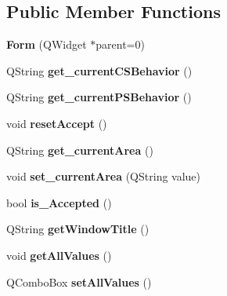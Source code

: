 \subsection*{Public Member Functions}
\begin{DoxyCompactItemize}
\item 
{\bfseries Form} (Q\+Widget $\ast$parent=0)\hypertarget{class_form_a9a921e26a02f23bffdea4330d6795796}{}\label{class_form_a9a921e26a02f23bffdea4330d6795796}

\item 
Q\+String {\bfseries get\+\_\+current\+C\+S\+Behavior} ()\hypertarget{class_form_a5323c5653fe4db9957374aa459583aab}{}\label{class_form_a5323c5653fe4db9957374aa459583aab}

\item 
Q\+String {\bfseries get\+\_\+current\+P\+S\+Behavior} ()\hypertarget{class_form_acca8606601f1767d3c65c25c324cb999}{}\label{class_form_acca8606601f1767d3c65c25c324cb999}

\item 
void {\bfseries reset\+Accept} ()\hypertarget{class_form_a4bee5f5335d89623ee9bce9f4fecd607}{}\label{class_form_a4bee5f5335d89623ee9bce9f4fecd607}

\item 
Q\+String {\bfseries get\+\_\+current\+Area} ()\hypertarget{class_form_a1152c1b4a3b711ce4a2b10d3e8a0d823}{}\label{class_form_a1152c1b4a3b711ce4a2b10d3e8a0d823}

\item 
void {\bfseries set\+\_\+current\+Area} (Q\+String value)\hypertarget{class_form_a50f09ab86b91b290cc9ea0d3b1a2eaf6}{}\label{class_form_a50f09ab86b91b290cc9ea0d3b1a2eaf6}

\item 
bool {\bfseries is\+\_\+\+Accepted} ()\hypertarget{class_form_aaf458e32135258145ca010a42cc08a3a}{}\label{class_form_aaf458e32135258145ca010a42cc08a3a}

\item 
Q\+String {\bfseries get\+Window\+Title} ()\hypertarget{class_form_abcb7636415d30c1207c2ab5a4f69c65c}{}\label{class_form_abcb7636415d30c1207c2ab5a4f69c65c}

\item 
void {\bfseries get\+All\+Values} ()\hypertarget{class_form_a17dff1f0df158f6b478441a79d1955b7}{}\label{class_form_a17dff1f0df158f6b478441a79d1955b7}

\item 
Q\+Combo\+Box {\bfseries set\+All\+Values} ()\hypertarget{class_form_a39f20b9caa964df0daeb0aaa71f045b5}{}\label{class_form_a39f20b9caa964df0daeb0aaa71f045b5}

\end{DoxyCompactItemize}

